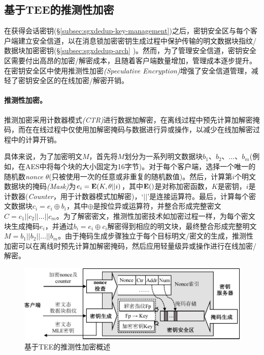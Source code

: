 \subsection{基于TEE的推测性加密}
\label{subsec:sgxdedup-encryption}

在获得会话密钥(\S\ref{subsec:sgxdedup-key-management})之后，密钥安全区与每个客户端建立安全信道，以在消息锁加密密钥生成过程中保护传输的明文数据块指纹/数据块加密密钥(\S\ref{subsec:sgxdedup-arch} )。然而，为了管理安全信道，密钥安全区需要付出高昂的加密/解密成本，且随着客户端数量增加，管理成本逐步提升。\sysnameS 在密钥安全区中使用推测性加密\textit{(Speculative Encryption)}\cite{eduardo2019Speculative}增强了安全信道管理，减轻了密钥安全区的在线加密/解密开销。

\paragraph*{推测性加密。}推测加密\cite{eduardo2019Speculative}采用计数器模式\textit{(CTR)}\cite{counter}进行数据加解密，在离线过程中预先计算加解密掩码，而在在线过程中仅使用加解密掩码与数据进行异或操作，以减少在线加解密过程中的计算开销。

具体来说，为了加密明文$M$，首先将$M$划分为一系列明文数据块$b_1、b_2、\ldots、b_m$(例如，在AES中将每个块的大小固定为16字节)。对于每个客户端，选择一个唯一的随机数\textit{nonce} $\theta$(只被使用一次的任意或非重复的随机数值)。然后，计算第$i$个明文数据块的掩码\textit{(Mask)}为$e_i = {\bf E}(K, \theta || i)$，其中${\bf E}()$是对称加密函数，$K$是密钥，$i$是计数器(\textit{Counter}，用于计数器模式加解密)，‘$||$’是连接运算符。最后，计算每个密文数据块$c_i = e_i \oplus b_i $，其中$\oplus$是按位异或运算符，并整合形成完整密文$C = c_1 || c_2 || \ldots || c_m$。为了解密密文，推测性加密技术如加密过程一样，为每个密文块生成掩码$e_i$，并通过$b_i = e_i \oplus c_i $解密得到相应的明文块，最终整合形成完整明文$M = b_1 || b_2 || \ldots || b_m$。由于掩码生成步骤独立于每个目标明文/密文的生成，推测性加密可以在离线时预先计算加解密掩码，然后应用轻量级异或操作进行在线加密/解密。

\begin{figure}[!htb]
    \centering
    \includegraphics[width=\textwidth]{pic/sgxdedup/key-enclave-arch.pdf}
    \caption{基于TEE的推测性加密概述}
    \label{fig:sgxdedup-SpecEnc}
\end{figure}

